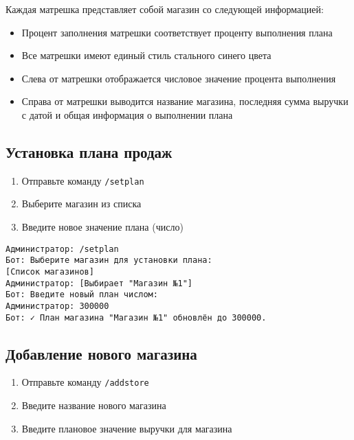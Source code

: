 \documentclass[a4paper,12pt]{article}
\begin{document}
\begin{tcolorbox}[colback=green!5, title=Информация о визуальных отчетах]
Каждая матрешка представляет собой магазин со следующей информацией:
\begin{itemize}
    \item Процент заполнения матрешки соответствует проценту выполнения плана
    \item Все матрешки имеют единый стиль стального синего цвета
    \item Слева от матрешки отображается числовое значение процента выполнения
    \item Справа от матрешки выводится название магазина, последняя сумма выручки с датой и общая информация о выполнении плана
\end{itemize}
\end{tcolorbox}

\subsection{Установка плана продаж}
\begin{enumerate}
    \item Отправьте команду \texttt{/setplan}
    \item Выберите магазин из списка
    \item Введите новое значение плана (число)
\end{enumerate}

\begin{tcolorbox}[colback=green!5, title=Пример установки плана]
\begin{verbatim}
Администратор: /setplan
Бот: Выберите магазин для установки плана:
[Список магазинов]
Администратор: [Выбирает "Магазин №1"]
Бот: Введите новый план числом:
Администратор: 300000
Бот: ✓ План магазина "Магазин №1" обновлён до 300000.
\end{verbatim}
\end{tcolorbox}

\subsection{Добавление нового магазина}
\begin{enumerate}
    \item Отправьте команду \texttt{/addstore}
    \item Введите название нового магазина
    \item Введите плановое значение выручки для магазина
\end{enumerate}
\end{document}
